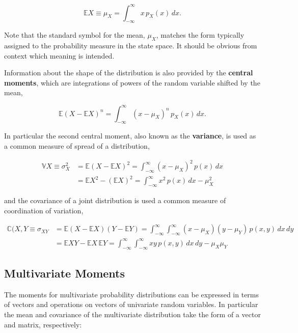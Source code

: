 \documentclass[12pt, twoside, draft]{article}
\begin{document}
\begin{equation}
\mathbb{E}X \equiv \mu_X = \int_{-\infty}^\infty x\,p_X(x)\,dx.
\end{equation}

Note that the standard symbol for the mean, $\mu_X$, matches the form typically assigned to the probability measure in the state space.  It should be obvious from context which meaning is intended.

Information about the shape of the distribution is also provided by the \textbf{central moments}, which are integrations of powers of the random variable shifted by the mean, 

\begin{equation}
\mathbb{E}(X - \mathbb{E}X)^n = \int_{-\infty}^\infty (x - \mu_X)^n \, p_X(x)\,dx.
\end{equation}

In particular the second central moment, also known as the \textbf{variance}, is used as a common measure of spread of a distribution,

\begin{align}
\mathbb{V}X \equiv \sigma_X^2 &= \mathbb{E}(X - \mathbb{E}X)^2 = \int_{-\infty}^\infty (x - \mu_X)^2 \, p(x)\,dx \\
&= \mathbb{E}X^2 - (\mathbb{E}X)^2 = \int_{-\infty}^\infty x^2 \, p(x)\,dx - \mu_X^2
\end{align}

and the covariance of a joint distribution is used a common measure of coordination of variation,

\begin{align}
\mathbb{C}(X,Y \equiv \sigma_{XY} &= \mathbb{E}(X - \mathbb{E}X)(Y - \mathbb{E}Y)= \int_{-\infty}^\infty \int_{-\infty}^{\infty}  (x - \mu_X)(y - \mu_Y) \, p(x,y)\,dx\,dy \\
&= \mathbb{E}XY - \mathbb{E}X\,\mathbb{E}Y= \int_{-\infty}^\infty \int_{-\infty}^\infty xy \, p(x,y)\,dx\,dy - \mu_X\mu_Y
\end{align}

\subsection{Multivariate Moments}

The moments for multivariate probability distributions can be expressed in terms of vectors and operations on vectors of univariate random variables.  In particular the mean and covariance of the multivariate distribution take the form of a vector and matrix, respectively:
\end{document}
